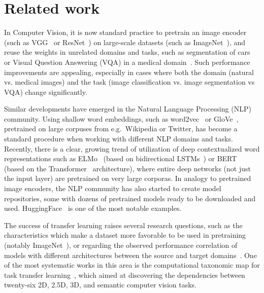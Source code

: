 \section{Related work}


In Computer Vision, it is now standard practice to pretrain an image encoder (such as VGG~\cite{simonyan2014very} or ResNet~\cite{he2016deep}) on large-scale datasets (such as ImageNet~\cite{deng2009imagenet}), and reuse the weights in unrelated domains and tasks, such as segmentation of cars~\cite{iglovikov2018ternausnet} or Visual Question Answering (VQA) in a medical domain~\cite{kornuta2019leveraging}.
Such performance improvements are appealing, especially in cases where both the domain (natural vs. medical images) and the task (image classification vs. image segmentation vs VQA) change significantly. %

Similar developments have emerged in the Natural Language Processing (NLP) community.
Using shallow word embeddings, such as word2vec~\cite{mikolov2013distributed} or GloVe~\cite{pennington2014glove}, pretrained on large corpuses from e.g.\ Wikipedia or Twitter, has become a standard procedure when working with different NLP domains and tasks.
Recently, there is a clear, growing trend of utilization of deep contextualized word representations such as ELMo~\cite{peters2018deep} (based on bidirectional LSTMs~\cite{hochreiter1997long}) or BERT~\cite{devlin2018bert} (based on the Transformer~\cite{vaswani2017attention} architecture), where entire deep networks (not just the input layer) are pretrained on very large corporas.
In analogy to pretrained image encoders, the NLP community has also started to create model repositories, some with dozens of pretrained models ready to be downloaded and used. HuggingFace~\cite{wolf2019transformers} is one of the most notable examples.

The success of transfer learning raises several research questions, such as the characteristics which make a dataset more favorable to be used in pretraining (notably ImageNet~\cite{huh2016makes}), or regarding the observed performance correlation of models with different architectures between the source and target domains~\cite{kornblith2019better}.
One of the most systematic works in this area is the computational taxonomic map for task transfer learning~\cite{zamir2018taskonomy}, which aimed at discovering the dependencies between twenty-six 2D, 2.5D, 3D, and semantic computer vision tasks.




